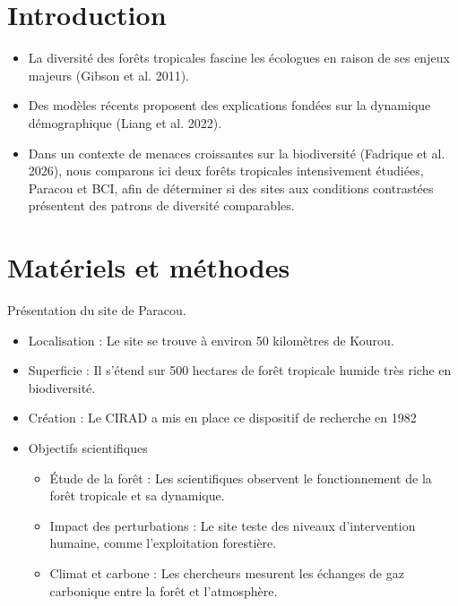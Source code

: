 \documentclass[
  french,
  11pt,
]{stylisharticle}
\affiliation{%
      \textsuperscript{1}%
      Université de Montpellier%
      , Département Scientifique%
      , Somewhere%
      , Montpellier%
      , France%
      , 34000%
    }
\providecommand{\tightlist}{%
  \setlength{\itemsep}{0pt}\setlength{\parskip}{0pt}}
\begin{document}
\flushbottom

\maketitle

\tableofcontents

\thispagestyle{empty}

\section{Introduction}\label{introduction}

\begin{itemize}
\tightlist
\item
  La diversité des forêts tropicales fascine les écologues en raison de
  ses enjeux majeurs ({Gibson et al.} 2011).
\item
  Des modèles récents proposent des explications fondées sur la
  dynamique démographique ({Liang et al.} 2022).
\item
  Dans un contexte de menaces croissantes sur la biodiversité ({Fadrique
  et al.} 2026), nous comparons ici deux forêts tropicales intensivement
  étudiées, Paracou et BCI, afin de déterminer si des sites aux
  conditions contrastées présentent des patrons de diversité
  comparables.
\end{itemize}

\section{Matériels et méthodes}\label{matuxe9riels-et-muxe9thodes}

Présentation du site de Paracou.

\begin{itemize}
\tightlist
\item
  Localisation : Le site se trouve à environ 50 kilomètres de Kourou.
\item
  Superficie : Il s'étend sur 500 hectares de forêt tropicale humide
  très riche en biodiversité.
\item
  Création : Le CIRAD a mis en place ce dispositif de recherche en 1982
\item
  Objectifs scientifiques

  \begin{itemize}
  \item
    Étude de la forêt : Les scientifiques observent le fonctionnement de
    la forêt tropicale et sa dynamique.
  \item
    Impact des perturbations : Le site teste des niveaux d'intervention
    humaine, comme l'exploitation forestière.
  \item
    Climat et carbone : Les chercheurs mesurent les échanges de gaz
    carbonique entre la forêt et l'atmosphère.
  \end{itemize}
\end{itemize}
\end{document}
